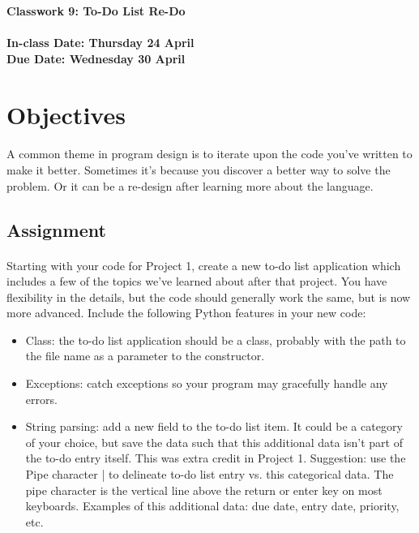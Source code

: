\documentclass[letter,10pt]{article}
\begin{document}
    
    \huge
    \textbf{Classwork 9: To-Do List Re-Do}
    \normalsize
    \\ ~~ \\
    \textbf{In-class Date: Thursday 24 April} \\
    \textbf{Due Date: Wednesday 30 April}
    
    \section*{Objectives}
    \paragraph{}A common theme in program design is to iterate upon the code you've written to make it better. Sometimes it's because you discover a better way to solve the problem. Or it can be a re-design after learning more about the language.
    
    \subsection*{Assignment}
    \paragraph{}Starting with your code for Project 1, create a new to-do list application which includes a few of the topics we've learned about after that project. You have flexibility in the details, but the code should generally work the same, but is now more advanced. Include the following Python features in your new code:
    \begin{itemize}
        \item Class: the to-do list application should be a class, probably with the path to the file name as a parameter to the constructor.
        \item Exceptions: catch exceptions so your program may gracefully handle any errors.
        \item String parsing: add a new field to the to-do list item. It could be a category of your choice, but save the data such that this additional data isn't part of the to-do entry itself. This was extra credit in Project 1. Suggestion: use the Pipe character | to delineate to-do list entry vs. this categorical data. The pipe character is the vertical line above the return or enter key on most keyboards. Examples of this additional data: due date, entry date, priority, etc.
    \end{itemize}
    
\end{document}
